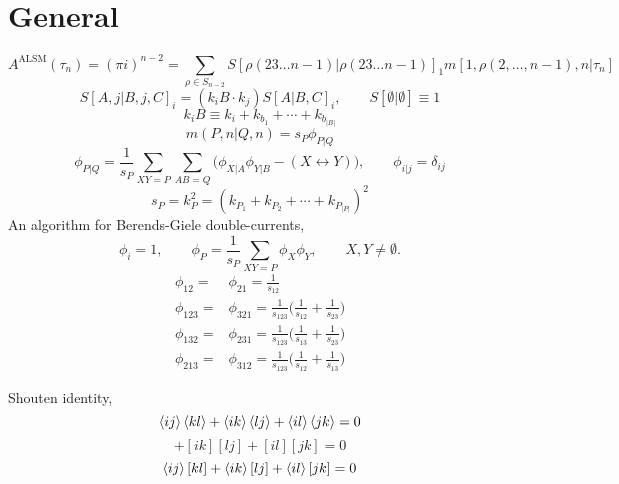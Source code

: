 \documentclass[a4paper,11pt]{article}
\begin{document}
\section{General}
\begin{equation}
    A^{\text{ALSM}}(\tau_n)=(\pi i)^{n-2}=\sum_{\rho\in S_{n-2}}S[\rho(23\dots n-1)|\rho(23\dots n-1)]_1 m[1,\rho(2,\dots,n-1),n|\tau_n]
\end{equation}
\begin{equation}
    S[A,j|B,j,C]_i=(k_iB\cdot k_j)S[A|B,C]_i,\qquad S[\emptyset|\emptyset]\equiv 1
\end{equation}
\begin{equation*}
    k_i B\equiv k_i+k_{b_1}+\cdots+k_{b_{|B|}}
\end{equation*}
\begin{equation}
    m(P,n|Q,n)=s_P \phi_{P|Q}
\end{equation}
\begin{equation}
    \phi_{P|Q}=\frac{1}{s_P}\sum_{XY=P}\sum_{AB=Q}\bigg(\phi_{X|A}\phi_{Y|B}-(X\leftrightarrow Y)\bigg),\qquad \phi_{i|j}=\delta_{ij}
\end{equation}
\begin{equation*}
    s_P=k_P^2=(k_{P_1}+k_{P_2}+\cdots+k_{P_{|P|}})^2
\end{equation*}
An algorithm for Berends-Giele double-currents,
\begin{equation}
    \phi_i=1,\qquad \phi_P=\frac{1}{s_P}\sum_{XY=P}\phi_X \phi_Y, \qquad X,Y\neq \emptyset.
\end{equation}
\begin{equation}
    \begin{split}
    \phi_{12}=&\phi_{21}=\frac{1}{s_{12}}\\
    \phi_{123}=&\phi_{321}=\frac{1}{s_{123}}\bigg(\frac{1}{s_{12}}+\frac{1}{s_{23}}\bigg)\\
    \phi_{132}=&\phi_{231}=\frac{1}{s_{123}}\bigg(\frac{1}{s_{13}}+\frac{1}{s_{23}}\bigg)\\
    \phi_{213}=&\phi_{312}=\frac{1}{s_{123}}\bigg(\frac{1}{s_{12}}+\frac{1}{s_{13}}\bigg)
    \end{split}
\end{equation}


Shouten identity,
\begin{equation}
    \braket{ij}\braket{kl}+\braket{ik}\braket{lj}+\braket{il}\braket{jk}=0
\end{equation}
\begin{equation}
    [ij][kl]+[ik][lj]+[il][jk]=0
\end{equation}
\begin{equation}
    \braket{ij}[kl]+\braket{ik}[lj]+\braket{il}[jk]=0
\end{equation}
\end{document}
